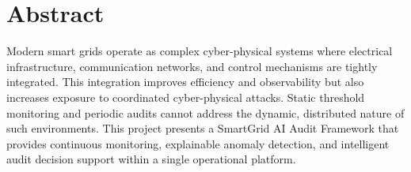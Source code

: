 \documentclass[12pt]{report}
\begin{document}

\begin{titlepage}


\end{titlepage}
\newpage



\begin{titlepage}

\end{titlepage}
\newpage


\begin{titlepage}

\end{titlepage}
\newpage






\chapter*{\centering Abstract}

Modern smart grids operate as complex cyber-physical systems where electrical infrastructure, communication networks, and control mechanisms are tightly integrated. This integration improves efficiency and observability but also increases exposure to coordinated cyber-physical attacks. Static threshold monitoring and periodic audits cannot address the dynamic, distributed nature of such environments. This project presents a SmartGrid AI Audit Framework that provides continuous monitoring, explainable anomaly detection, and intelligent audit decision support within a single operational platform.
\end{document}
